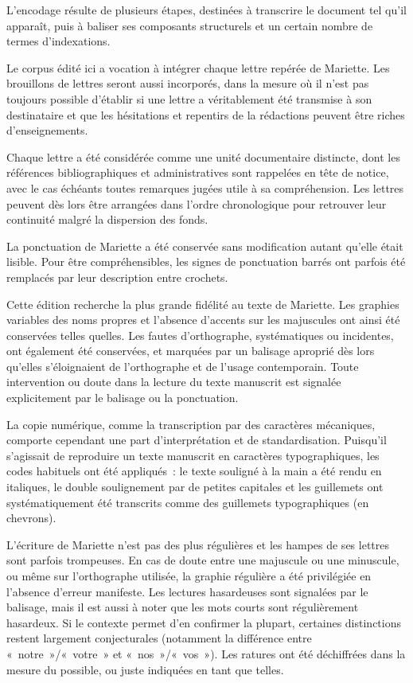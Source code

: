 \documentclass{book}
\begin{document}
\par L’encodage résulte de plusieurs étapes, destinées à transcrire le document tel qu’il apparaît, puis à baliser ses composants structurels et un certain nombre de termes d’indexations.
\par Le corpus édité ici a vocation à intégrer chaque lettre repérée de Mariette. Les brouillons de lettres seront aussi incorporés, dans la mesure où il n’est pas toujours possible d’établir si une lettre a véritablement été transmise à son destinataire et que les hésitations et repentirs de la rédactions peuvent être riches d’enseignements.
\par Chaque lettre a été considérée comme une unité documentaire distincte, dont les références bibliographiques et administratives sont rappelées en tête de notice, avec le cas échéants toutes remarques jugées utile à sa compréhension. Les lettres peuvent dès lors être arrangées dans l’ordre chronologique pour retrouver leur continuité malgré la dispersion des fonds.
\par La ponctuation de Mariette a été conservée sans modification autant qu’elle était lisible. Pour être compréhensibles, les signes de ponctuation barrés ont parfois été remplacés par leur description entre crochets.
\par Cette édition recherche la plus grande fidélité au texte de Mariette. Les graphies variables des noms propres et l’absence d’accents sur les majuscules ont ainsi été conservées telles quelles. Les fautes d’orthographe, systématiques ou incidentes, ont également été conservées, et marquées par un balisage aproprié dès lors qu’elles s’éloignaient de l’orthographe et de l’usage contemporain. Toute intervention ou doute dans la lecture du texte manuscrit est signalée explicitement par le balisage ou la ponctuation.
\par La copie numérique, comme la transcription par des caractères mécaniques, comporte cependant une part d’interprétation et de standardisation. Puisqu’il s’agissait de reproduire un texte manuscrit en caractères typographiques, les codes habituels ont été appliqués~: le texte souligné à la main a été rendu en italiques, le double soulignement par de petites capitales et les guillemets ont systématiquement été transcrits comme des guillemets typographiques (en chevrons).
\par L’écriture de Mariette n'est pas des plus régulières et les hampes de ses lettres sont parfois trompeuses. En cas de doute entre une majuscule ou une minuscule, ou même sur l’orthographe utilisée, la graphie régulière a été privilégiée en l’absence d’erreur manifeste. Les lectures hasardeuses sont signalées par le balisage, mais il est aussi à noter que les mots courts sont régulièrement hasardeux. Si le contexte permet d’en confirmer la plupart, certaines distinctions restent largement conjecturales (notamment la différence entre «~notre~»/«~votre~» et «~nos~»/«~vos~»). Les ratures ont été déchiffrées dans la mesure du possible, ou juste indiquées en tant que telles.
\end{document}

